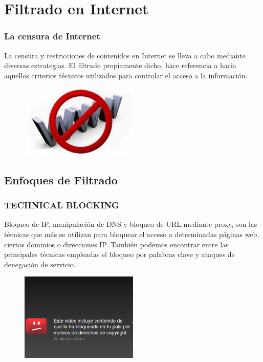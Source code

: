\documentclass{beamer}
\begin{document}
\section{Filtrado en Internet}
\frame
{
\transdissolve[duration=0.2]
\frametitle{La censura de Internet}
La censura y restricciones de contenidos en Internet se lleva a cabo mediante diversas estrategias. El filtrado propiamente dicho, hace referencia a hacia aquellos criterios t\'ecnicos utilizados para controlar el acceso a la informaci\'on.
\begin{figure}
  \centering
    \includegraphics[width=0.5\textwidth]{cens_web.jpg}
  \label{fig:ejemplo}
\end{figure}
}

\subsection{Enfoques de Filtrado}

\frame
{
\transdissolve[duration=0.2]
\frametitle{TECHNICAL BLOCKING}
Bloqueo de IP, manipulaci\'on de DNS y bloqueo de URL mediante proxy, son las t\'ecnicas que m\'as se utilizan para bloquear el acceso a determinadas p\'aginas web, ciertos dominios o direcciones IP. Tambi\'en podemos encontrar entre las principales t\'ecnicas empleadas el bloqueo por palabras clave y ataques de denegaci\'on de servicio.
\begin{figure}
  \centering
    \includegraphics[width=0.5\textwidth]{cens_yt.png}
  \label{fig:ejemplo}
\end{figure}
}
\end{document}
